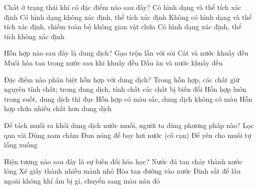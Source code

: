 \documentclass[FileMain.tex]{subfiles}
\begin{document}
\begin{ex}%
Chất ở trạng thái khí có đặc điểm nào sau đây?
\choice
{Có hình dạng và thể tích xác định}
{Có hình dạng không xác định, thể tích xác định}
{\True Không có hình dạng và thể tích xác định, chiếm toàn bộ không gian vật chứa}
{Có hình dạng xác định, thể tích không xác định}
\end{ex}

\begin{ex}%
Hỗn hợp nào sau đây là dung dịch?
\choice
{Gạo trộn lẫn với sỏi}
{Cát và nước khuấy đều}
{\True Muối hòa tan trong nước sau khi khuấy đều}
{Dầu ăn và nước khuấy đều}
\end{ex}

\begin{ex}%
Đặc điểm nào phân biệt hỗn hợp với dung dịch?
\choice
{\True Trong hỗn hợp, các chất giữ nguyên tính chất; trong dung dịch, tính chất các chất bị biến đổi}
{Hỗn hợp luôn trong suốt, dung dịch thì đục}
{Hỗn hợp có màu sắc, dung dịch không có màu}
{Hỗn hợp chứa nhiều chất hơn dung dịch}
\end{ex}

\begin{ex}%
Để tách muối ra khỏi dung dịch nước muối, người ta dùng phương pháp nào?
\choice
{Lọc qua vải}
{Dùng nam châm}
{\True Đun nóng để bay hơi nước (cô cạn)}
{Để yên cho muối tự lắng xuống}
\end{ex}

\begin{ex}%
Hiện tượng nào sau đây là sự biến đổi hóa học?
\choice
{Nước đá tan chảy thành nước lỏng}
{Xé giấy thành nhiều mảnh nhỏ}
{Hòa tan đường vào nước}
{\True Đinh sắt để lâu ngoài không khí ẩm bị gỉ, chuyển sang màu nâu đỏ}
\end{ex}
\end{document}
